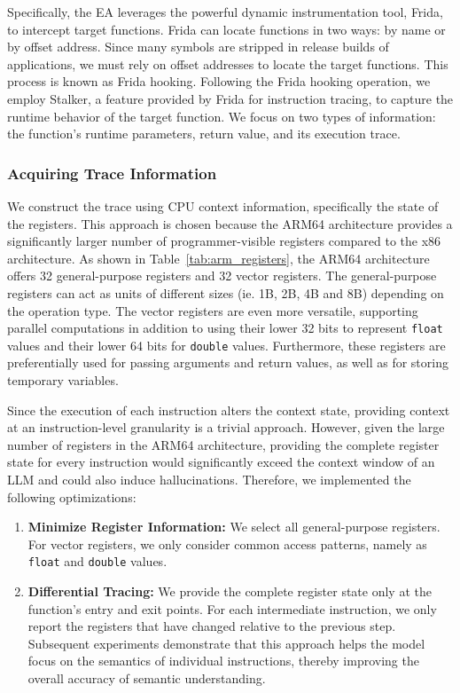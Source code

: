 \documentclass[acmsmall,screen,review,anonymous]{acmart} %
\begin{document}
Specifically, the EA leverages the powerful dynamic instrumentation tool, Frida, to intercept target functions. Frida can locate functions in two ways: by name or by offset address. Since many symbols are stripped in release builds of applications, we must rely on offset addresses to locate the target functions. This process is known as Frida hooking. Following the Frida hooking operation, we employ Stalker, a feature provided by Frida for instruction tracing, to capture the runtime behavior of the target function. We focus on two types of information: the function's runtime parameters, return value, and its execution trace.

\subsubsection{Acquiring Trace Information}

We construct the trace using CPU context information, specifically the state of the registers. This approach is chosen because the ARM64 architecture provides a significantly larger number of programmer-visible registers compared to the x86 architecture. As shown in Table~\ref{tab:arm_registers}, the ARM64 architecture offers 32 general-purpose registers and 32 vector registers. The general-purpose registers can act as units of different sizes (ie. 1B, 2B, 4B and 8B) depending on the operation type. The vector registers are even more versatile, supporting parallel computations in addition to using their lower 32 bits to represent \texttt{float} values and their lower 64 bits for \texttt{double} values. Furthermore, these registers are preferentially used for passing arguments and return values, as well as for storing temporary variables.

Since the execution of each instruction alters the context state, providing context at an instruction-level granularity is a trivial approach. However, given the large number of registers in the ARM64 architecture, providing the complete register state for every instruction would significantly exceed the context window of an LLM and could also induce hallucinations. Therefore, we implemented the following optimizations:
\begin{enumerate}
    \item \textbf{Minimize Register Information:} We select all general-purpose registers. For vector registers, we only consider common access patterns, namely as \texttt{float} and \texttt{double} values.
    \item \textbf{Differential Tracing:} We provide the complete register state only at the function's entry and exit points. For each intermediate instruction, we only report the registers that have changed relative to the previous step. Subsequent experiments demonstrate that this approach helps the model focus on the semantics of individual instructions, thereby improving the overall accuracy of semantic understanding.
\end{enumerate}
\end{document}
